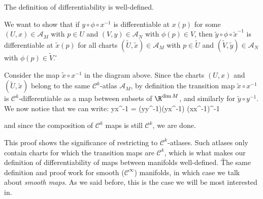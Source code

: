 \bt[]
The definition of differentiability is well-defined.
\et

\bq
We want to show that if $y\circ\phi\circ x^{-1}$ is differentiable at $x(p)$ for some $(U,x)\in\mathscr{A}_M$ with
$p\in U$ and $(V,y)\in\mathscr{A}_N$ with $\phi(p)\in V$, then $\widetilde y\circ\phi\circ \widetilde x^{-1}$ is
differentiable at $\widetilde x(p)$ for all charts $(\widetilde U,\widetilde x)\in\mathscr{A}_M$ with $p\in
\widetilde U$ and $(\widetilde V,\widetilde y)\in\mathscr{A}_N$ with $\phi(p)\in \widetilde V$. \v

\bse
{}
\ese

\vspace{10pt}

Consider the map $\widetilde x\circ x^{-1}$ in the diagram above. Since the charts $(U,x)$ and $(\widetilde U,
\widetilde x)$ belong to the same $\mathcal{C}^k$-atlas $\mathscr{A}_M$, by definition the transition map $\widetilde
x\circ x^{-1}$ is $\mathcal{C}^k$-differentiable as a map between subsets of $\R^{\dim M}$, and similarly for
$\widetilde y\circ y^{-1}$. We now notice that we can write:
\bse
\widetilde y\circ\phi\circ \widetilde x^{-1} = (\widetilde y\circ y^{-1})\circ(y\circ\phi\circ x^{-1})\circ
(\widetilde x\circ x^{-1})^{-1}
\ese

and since the composition of $\mathcal{C}^k$ maps is still $\mathcal{C}^k$, we are done.
\eq

This proof shows the significance of restricting to $\mathcal{C}^k$-atlases. Such atlases only contain charts for
which the transition maps are $\mathcal{C}^k$, which is what makes our definition of differentiability of maps
between manifolds well-defined. \v

The same definition and proof work for smooth ($\mathcal{C}^\infty$) manifolds, in which case we talk about
\emph{smooth maps}. As we said before, this is the case we will be most interested in.

